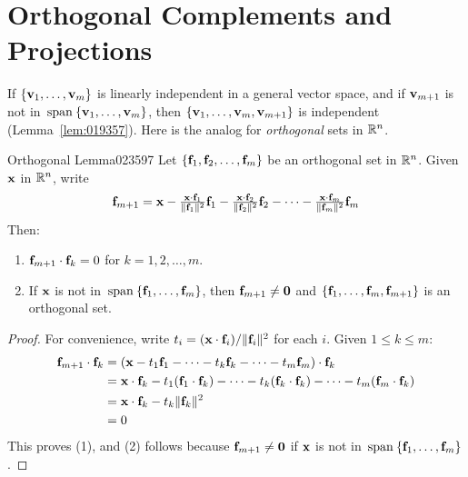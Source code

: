 \section{Orthogonal Complements and Projections}
\label{sec:8_1}

If $\{\textbf{v}_{1}, \dots , \textbf{v}_{m}\}$ is linearly independent in a general vector space, and if $\textbf{v}_{m+1}$ is not in $\thinspace\operatorname{span\medspace}\{\textbf{v}_{1}, \dots , \textbf{v}_{m}\}$, then $\{\textbf{v}_{1}, \dots , \textbf{v}_{m}, \textbf{v}_{m+1}\}$ is independent (Lemma~\ref{lem:019357}). Here is the analog for \textit{orthogonal} sets in $\mathbb{R}^n$.


\begin{lemma}{Orthogonal Lemma}{023597}
Let $\{\textbf{f}_{1}, \textbf{f}_{2}, \dots , \textbf{f}_{m}\}$ be an orthogonal set in $\mathbb{R}^n$. Given $\textbf{x}$ in $\mathbb{R}^n$, write
\begin{equation*}
\textbf{f}_{m+1} = \textbf{x} - \tfrac{\textbf{x} \cdot \textbf{f}_{1}}{\| \textbf{f}_{1} \|^2}\textbf{f}_{1} - \tfrac{\textbf{x} \cdot \textbf{f}_{2}}{\| \textbf{f}_{2} \|^2}\textbf{f}_{2} - \dots - \tfrac{\textbf{x} \cdot \textbf{f}_{m}}{\| \textbf{f}_{m} \|^2}\textbf{f}_{m}
\end{equation*}
Then:

\begin{enumerate}
\item $\textbf{f}_{m+1} \cdot \textbf{f}_{k} = 0$ for $k = 1, 2, \dots , m$.

\item If $\textbf{x}$ is not in $\thinspace\operatorname{span\medspace}\{\textbf{f}_{1}, \dots , \textbf{f}_{m}\}$, then $\textbf{f}_{m+1} \neq \textbf{0}$ and $\{\textbf{f}_{1}, \dots , \textbf{f}_{m}, \textbf{f}_{m+1}\}$ is an orthogonal set.

\end{enumerate}
\end{lemma}

\begin{proof}
For convenience, write $t_{i} = (\textbf{x} \cdot \textbf{f}_{i}) / \|\textbf{f}_{i}\|^{2}$ for each $i$. Given $1 \leq k \leq m$:
\begin{align*}
\textbf{f}_{m+1} \cdot \textbf{f}_{k} 
&= (\textbf{x} - t_{1}\textbf{f}_{1} - \dots -t_{k}\textbf{f}_{k} - \dots -t_{m}\textbf{f}_{m}) \cdot \textbf{f}_{k} \\
&= \textbf{x} \cdot \textbf{f}_{k} - t_{1}(\textbf{f}_{1} \cdot \textbf{f}_{k}) - \dots -t_{k}(\textbf{f}_{k} \cdot \textbf{f}_{k}) - \dots -t_{m}(\textbf{f}_{m} \cdot \textbf{f}_{k}) \\
&= \textbf{x} \cdot \textbf{f}_{k} - t_{k} \| \textbf{f}_{k} \|^2 \\
&= 0 
\end{align*}
This proves (1), and (2) follows because $\textbf{f}_{m + 1} \neq \textbf{0}$ if $\textbf{x}$ is not in $\thinspace\operatorname{span\medspace}\{\textbf{f}_{1}, \dots , \textbf{f}_{m}\}$.
\end{proof}

